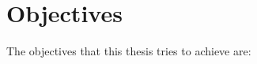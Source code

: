 \section{Objectives} %
\label{sec:intro:motivation}




The objectives that this thesis tries to achieve are:

